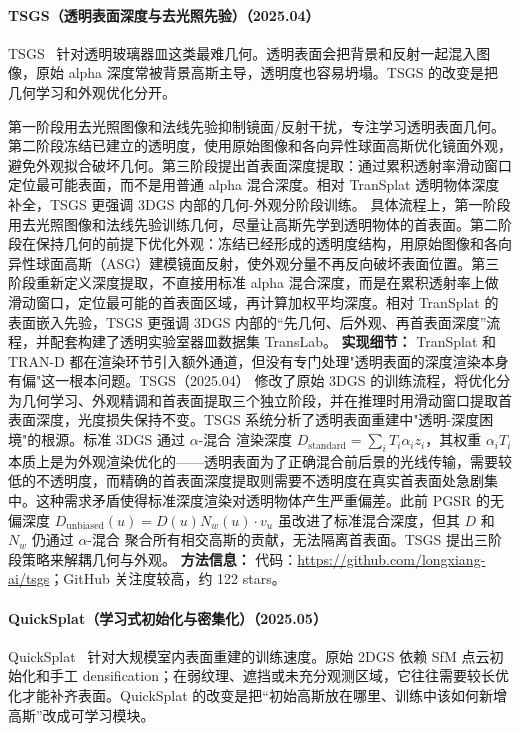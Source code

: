 \paragraph{TSGS（透明表面深度与去光照先验）（2025.04）}
TSGS~\cite{2504_12799} 针对透明玻璃器皿这类最难几何。透明表面会把背景和反射一起混入图像，原始 alpha 深度常被背景高斯主导，透明度也容易坍塌。TSGS 的改变是把几何学习和外观优化分开。

第一阶段用去光照图像和法线先验抑制镜面/反射干扰，专注学习透明表面几何。第二阶段冻结已建立的透明度，使用原始图像和各向异性球面高斯优化镜面外观，避免外观拟合破坏几何。第三阶段提出首表面深度提取：通过累积透射率滑动窗口定位最可能表面，而不是用普通 alpha 混合深度。相对 TranSplat 透明物体深度补全，TSGS 更强调 3DGS 内部的几何-外观分阶段训练。
具体流程上，第一阶段用去光照图像和法线先验训练几何，尽量让高斯先学到透明物体的首表面。第二阶段在保持几何的前提下优化外观：冻结已经形成的透明度结构，用原始图像和各向异性球面高斯（ASG）建模镜面反射，使外观分量不再反向破坏表面位置。第三阶段重新定义深度提取，不直接用标准 alpha 混合深度，而是在累积透射率上做滑动窗口，定位最可能的首表面区域，再计算加权平均深度。相对 TranSplat 的表面嵌入先验，TSGS 更强调 3DGS 内部的“先几何、后外观、再首表面深度”流程，并配套构建了透明实验室器皿数据集 TransLab。
\textbf{实现细节：} TranSplat 和 TRAN-D 都在渲染环节引入额外通道，但没有专门处理"透明表面的深度渲染本身有偏"这一根本问题。TSGS（2025.04） 修改了原始 3DGS 的训练流程，将优化分为几何学习、外观精调和首表面提取三个独立阶段，并在推理时用滑动窗口提取首表面深度，光度损失保持不变。TSGS 系统分析了透明表面重建中"透明-深度困境"的根源。标准 3DGS 通过 $\alpha$-混合 渲染深度 $D_{\mathrm{standard}} = \sum_{i} T_i \alpha_i z_i$，其权重 $\alpha_i T_i$ 本质上是为外观渲染优化的——透明表面为了正确混合前后景的光线传输，需要较低的不透明度，而精确的首表面深度提取则需要不透明度在真实首表面处急剧集中。这种需求矛盾使得标准深度渲染对透明物体产生严重偏差。此前 PGSR 的无偏深度 $D_{\mathrm{unbiased}}(u) = D(u) N_w(u) \cdot v_u$ 虽改进了标准混合深度，但其 $D$ 和 $N_w$ 仍通过 $\alpha$-混合 聚合所有相交高斯的贡献，无法隔离首表面。TSGS 提出三阶段策略来解耦几何与外观。
\textbf{方法信息：} 代码：\url{https://github.com/longxiang-ai/tsgs}；GitHub 关注度较高，约 122 stars。



\paragraph{QuickSplat（学习式初始化与密集化）（2025.05）}
QuickSplat~\cite{2505_05591} 针对大规模室内表面重建的训练速度。原始 2DGS 依赖 SfM 点云初始化和手工 densification；在弱纹理、遮挡或未充分观测区域，它往往需要较长优化才能补齐表面。QuickSplat 的改变是把“初始高斯放在哪里、训练中该如何新增高斯”改成可学习模块。

